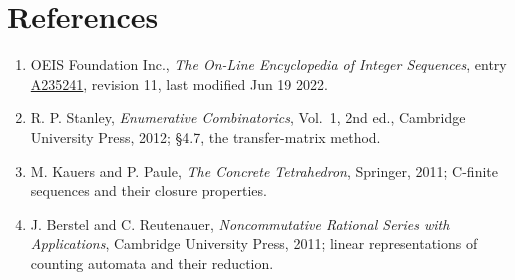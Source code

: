 \documentclass[11pt]{article}
\theoremstyle{definition}
\begin{document}
\section{References}

\begin{enumerate}

\item OEIS Foundation Inc., \emph{The On-Line Encyclopedia of Integer Sequences}, entry \href{https://oeis.org/A235241}{A235241}, revision 11, last modified Jun 19 2022.

\item R. P. Stanley, \emph{Enumerative Combinatorics}, Vol.~1, 2nd ed., Cambridge University Press, 2012; \S4.7, the transfer-matrix method.

\item M. Kauers and P. Paule, \emph{The Concrete Tetrahedron}, Springer, 2011; C-finite sequences and their closure properties.

\item J. Berstel and C. Reutenauer, \emph{Noncommutative Rational Series with Applications}, Cambridge University Press, 2011; linear representations of counting automata and their reduction.

\end{enumerate}
\end{document}
